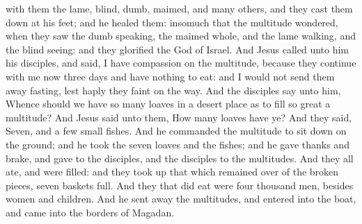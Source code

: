 with them the lame, blind, dumb, maimed, and many others, and they cast them down at his feet; and he healed them: insomuch that the multitude wondered, when they saw the dumb speaking, the maimed whole, and the lame walking, and the blind seeing: and they glorified the God of Israel.  And Jesus called unto him his disciples, and said, I have compassion on the multitude, because they continue with me now three days and have nothing to eat: and I would not send them away fasting, lest haply they faint on the way. And the disciples say unto him, Whence should we have so many loaves in a desert place as to fill so great a multitude? And Jesus said unto them, How many loaves have ye? And they said, Seven, and a few small fishes. And he commanded the multitude to sit down on the ground; and he took the seven loaves and the fishes; and he gave thanks and brake, and gave to the disciples, and the disciples to the multitudes. And they all ate, and were filled: and they took up that which remained over of the broken pieces, seven baskets full. And they that did eat were four thousand men, besides women and children. And he sent away the multitudes, and entered into the boat, and came into the borders of Magadan. 

